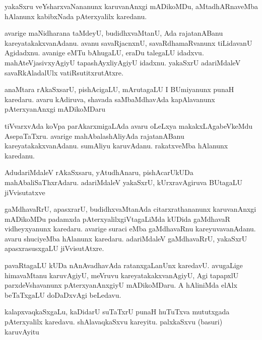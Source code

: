 \documentclass{article}
\begin{document}
\begin{mn}
yakaSxru veYsharxvaNananunx karuvanAnxgi mADikoMDu, aMtadhARnaveMba hAlanunx 
kabibxNada pAterxyalilx karedanu.
\end{mn}

\begin{mn}
avarige maNidharana taMdeyU, budidhxvaMtanU, Ada rajatanABanu kareyatakakxvanAdanu.  
avanu savaRjacnxnU, savaRdhamaRvanunx tiLidavanU Agidadxnu.  avanige eMTu bAhugaLU, 
eraDu talegaLU idadxvu. mahAteVjasivxyAgiyU  tapashAyxliyAgiyU idadxnu. yakaSxrU 
adariMdaleV savaRkAladalUlx vatiRsutitxrutAtxre.
\end{mn}

\begin{mn}
anaMtara rAkaSxsarU, pishAcigaLU, mArutagaLU I BUmiyanunx punaH karedaru.  
avaru kAdiruva, shavada saMbaMdhavAda kapAlavanunx pAterxyanAnxgi mADikoMDaru
\end{mn}

\begin{mn}
tiVvarxvAda koVpa parAkarxmigaLAda avaru oLeLxya makakxLAgabeVkeMdu AsepaTaTxru.  
avarige mahAbalashAliyAda rajatanABanu kareyatakakxvanAdanu.  sumAliyu 
karuvAdanu. rakatxveMba hAlanunx karedanu.
\end{mn}

\begin{mn}
AdudariMdaleV rAkaSxsaru, yAtudhAnaru,  pishAcarUkUDa mahAbaliSaThxrAdaru. 
adariMdaleV  yakaSxrU, kUrxravAgiruva BUtagaLU jiVvisutatxve
\end{mn}

\begin{mn}
gaMdhavaRrU, apasxrarU, budidhxvaMtanAda citarxrathananunx karuvanAnxgi 
mADikoMDu padamxda pAterxyalilxgiVtagaLiMda kUDida gaMdhavaR vidheyxyanunx 
karedaru.  avarige suraci eMba gaMdhavaRnu kareyuvavanAdanu. avaru shuciyeMba 
hAlanunx karedaru. adariMdaleV gaMdhavaRrU, yakaSxrU apasxrasusxgaLU jiVvisutAtxre.
\end{mn}

\begin{mn}
pavaRtagaLU kUDa nAnAvadhavAda ratanxgaLanUnx karedavU.  avugaLige himavaMtanu 
karuvAgiyU, meVruvu kareyatakakxvanAgiyU,  Agi tapapxlU parxdeVshavanunx 
pAterxyanAnxgiyU mADikoMDaru.  A hAliniMda elAlx beTaTxgaLU doDaDxvAgi beLedavu.
\end{mn}

\begin{mn}
kalapxvaqkaSxgaLu, kaDidarU suTaTxrU punaH huTuTxva mututxgada pAterxyalilx 
karedavu.  shAlavaqkaSxvu kareyitu.  palxkaSxvu (basuri) karuvAyitu
\end{mn}
\end{document}
